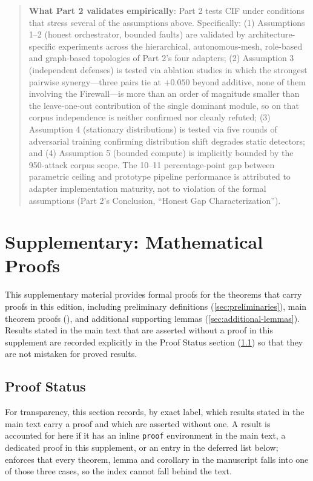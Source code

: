 \documentclass[
]{article}
\newcounter{none} %
\begin{document}
\begin{quote}
\textbf{What Part 2 validates empirically}: Part 2
\cite{friedman2026cogsec2} tests CIF under conditions that stress
several of the assumptions above. Specifically: (1) Assumptions 1--2
(honest orchestrator, bounded faults) are validated by
architecture-specific experiments across the hierarchical,
autonomous-mesh, role-based and graph-based topologies of Part 2's four
adapters; (2) Assumption 3 (independent defenses) is tested via ablation
studies in which the strongest pairwise synergy---three pairs tie at
\(+0.050\) beyond additive, none of them involving the Firewall---is
more than an order of magnitude smaller than the leave-one-out
contribution of the single dominant module, so on that corpus
independence is neither confirmed nor cleanly refuted; (3) Assumption 4
(stationary distributions) is tested via five rounds of adversarial
training confirming distribution shift degrades static detectors; and
(4) Assumption 5 (bounded compute) is implicitly bounded by the
950-attack corpus scope. The 10--11 percentage-point gap between
parametric ceiling and prototype pipeline performance is attributed to
adapter implementation maturity, not to violation of the formal
assumptions (Part 2's Conclusion, ``Honest Gap Characterization'').
\end{quote}

\newpage

\newpage

\section{Supplementary: Mathematical
Proofs}\label{supplementary-mathematical-proofs}

This supplementary material provides formal proofs for the theorems that
carry proofs in this edition, including preliminary definitions
(\cref{sec:preliminaries}), main theorem proofs
(), and additional
supporting lemmas (\cref{sec:additional-lemmas}). Results stated in the
main text that are asserted without a proof in this supplement are
recorded explicitly in the Proof Status section
(\cref{sec:proof-status}) so that they are not mistaken for proved
results.

\subsection{Proof Status}\label{sec:proof-status}

For transparency, this section records, by exact label, which results
stated in the main text carry a proof and which are asserted without
one. A result is accounted for here if it has an inline \texttt{proof}
environment in the main text, a dedicated proof in this supplement, or
an entry in the deferred list below;
 enforces that every theorem, lemma
and corollary in the manuscript falls into one of those three cases, so
the index cannot fall behind the text.
\end{document}
